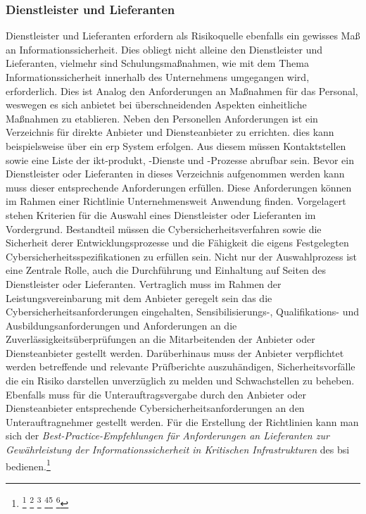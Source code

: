 \documentclass[11pt,a4paper,hidelinks]{article}   %
\begin{document}
            \subsubsection{Dienstleister und Lieferanten} 
            Dienstleister und Lieferanten erfordern als Risikoquelle ebenfalls ein gewisses Maß an Informationssicherheit. Dies obliegt nicht alleine den Dienstleister und Lieferanten, vielmehr sind Schulungsmaßnahmen, wie mit dem Thema Informationssicherheit innerhalb des Unternehmens umgegangen wird, erforderlich. Dies ist Analog den Anforderungen an Maßnahmen für das Personal, weswegen es sich anbietet bei überschneidenden Aspekten einheitliche Maßnahmen zu etablieren.
            Neben den Personellen Anforderungen ist ein Verzeichnis für direkte Anbieter und Diensteanbieter zu errichten. dies kann beispielsweise über ein \gls{erp} System erfolgen. Aus diesem müssen Kontaktstellen sowie eine Liste der \gls{ikt-produkt}, -Dienste und -Prozesse abrufbar sein. Bevor ein Dienstleister oder Lieferanten in dieses Verzeichnis aufgenommen werden kann muss dieser entsprechende Anforderungen erfüllen. Diese Anforderungen können im Rahmen einer Richtlinie Unternehmensweit Anwendung finden. Vorgelagert stehen Kriterien für die Auswahl eines Dienstleister oder Lieferanten im Vordergrund. Bestandteil müssen die Cybersicherheitsverfahren sowie die Sicherheit derer Entwicklungsprozesse und die Fähigkeit die eigens Festgelegten Cybersicherheitsspezifikationen zu erfüllen sein. Nicht nur der Auswahlprozess ist eine Zentrale Rolle, auch die Durchführung und Einhaltung auf Seiten des Dienstleister oder Lieferanten. Vertraglich muss im Rahmen der Leistungsvereinbarung mit dem Anbieter geregelt sein das die Cybersicherheitsanforderungen eingehalten, Sensibilisierungs-, Qualifikations- und Ausbildungsanforderungen und Anforderungen an die Zuverlässigkeitsüberprüfungen an die Mitarbeitenden der Anbieter oder Diensteanbieter gestellt werden. Darüberhinaus muss der Anbieter verpflichtet werden betreffende und relevante Prüfberichte auszuhändigen, Sicherheitsvorfälle die ein Risiko darstellen unverzüglich zu melden und Schwachstellen zu beheben. Ebenfalls muss für die Unterauftragsvergabe durch den Anbieter oder Diensteanbieter entsprechende Cybersicherheitsanforderungen an den Unterauftragnehmer gestellt werden. Für die Erstellung der Richtlinien kann man sich der \emph{Best-Practice-Empfehlungen für Anforderungen an Lieferanten zur Gewährleistung der Informationssicherheit in Kritischen Infrastrukturen} des \gls{bsi} bedienen.\footnote{
                \footcite[Vgl. Nummer 5.2.][]{EU2024-2690}
                \footcite[Vgl. Nummer 8.2.1.][]{EU2024-2690}
                \footcite[Vgl. Nummer 10.1.2. Buchstabe a und b][]{EU2024-2690}
                \footcite[Vgl. S. 5][]{bsi:36ef69}\footcite[Vgl. Nummer 5.1.2.][]{EU2024-2690}
                \footcite[Vgl. Nummer 5.1.4.][]{EU2024-2690}
            }
\end{document}
